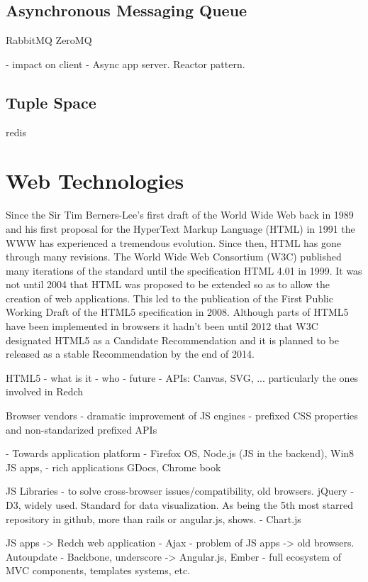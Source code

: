 \subsection{Asynchronous Messaging Queue}
RabbitMQ
ZeroMQ

- impact on client
- Async app server. Reactor pattern.

\subsection{Tuple Space}
redis

\section{Web Technologies}

Since the Sir Tim Berners-Lee's first draft of the World Wide Web back in 1989 and his first proposal for the HyperText Markup Language (HTML) \cite{HTMLtags} in 1991 the WWW has experienced a tremendous evolution. Since then, HTML has gone through many revisions. The World Wide Web Consortium (W3C) published many iterations of the standard until the specification HTML 4.01 in 1999. It was not until 2004 that HTML was proposed to be extended so as to allow the creation of web applications. This led to the publication of the First Public Working Draft of the HTML5 specification in 2008. Although parts of HTML5 have been implemented in browsers it hadn't been until 2012 that W3C designated HTML5 as a Candidate Recommendation and it is planned to be released as a stable Recommendation by the end of 2014.

HTML5	
	- what is it
	- who
	- future
	- APIs: Canvas, SVG, ... particularly the ones involved in Redch

Browser vendors
	- dramatic improvement of JS engines
	- prefixed CSS properties and non-standarized prefixed APIs

	- Towards application platform
		- Firefox OS, Node.js (JS in the backend), Win8 JS apps, 
		- rich applications GDocs, Chrome book

JS Libraries
	- to solve cross-browser issues/compatibility, old browsers. jQuery
	- D3, widely used. Standard for data visualization. As being the 5th most starred repository in github, more than rails or angular.js, shows.
	- Chart.js

JS apps -> Redch web application 
	- Ajax
	- problem of JS apps -> old browsers. Autoupdate
	- Backbone, underscore -> Angular.js, Ember
	- full ecosystem of MVC components, templates systems, etc.

